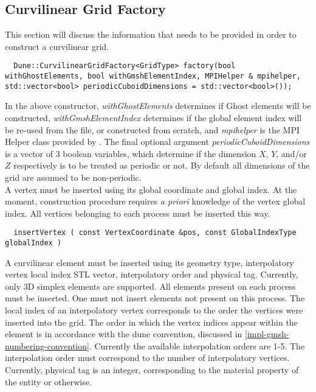 \subsection{Curvilinear Grid Factory}
\label{interface-grid-factory}

This section will discuss the information that needs to be provided in order to construct a curvilinear grid.

\begin{mybox}
\begin{lstlisting}
  Dune::CurvilinearGridFactory<GridType> factory(bool withGhostElements, bool withGmshElementIndex, MPIHelper & mpihelper, std::vector<bool> periodicCuboidDimensions = std::vector<bool>());
\end{lstlisting}
\end{mybox}

\noindent
In the above constructor, \textit{withGhostElements} determines if Ghost elements will be constructed, \textit{withGmshElementIndex} determines if the global element index will be re-used from the \gmsh{} file, or constructed from scratch, and \textit{mpihelper} is the MPI Helper class provided by \dune{}. The final optional argument \textit{periodicCuboidDimensions} is a vector of 3 boolean variables, which determine if the dimension $X$, $Y$, and/or $Z$ respectively is to be treated as periodic or not. By default all dimensions of the grid are assumed to be non-periodic. \\

\noindent
A vertex must be inserted using its global coordinate and global index. At the moment, \curvgrid{} construction procedure requires \textit{a priori} knowledge of the vertex global index. All vertices belonging to each process must be inserted this way.

\begin{mybox}
\begin{lstlisting}
  insertVertex ( const VertexCoordinate &pos, const GlobalIndexType globalIndex )
\end{lstlisting}
\end{mybox}

\noindent
A curvilinear element must be inserted using its geometry type, interpolatory vertex local index STL vector, interpolatory order and physical tag. Currently, only 3D simplex elements are supported. All elements present on each process must be inserted. One must not insert elements not present on this process. The local index of an interpolatory vertex corresponds to the order the vertices were inserted into the grid. The order in which the vertex indices appear within the element is in accordance with the dune convention, discussed in \cref{impl-gmsh-numbering-convention}. Currently the available interpolation orders are 1-5. The interpolation order must correspond to the number of interpolatory vertices. Currently, physical tag is an integer, corresponding to the material property of the entity or otherwise.

